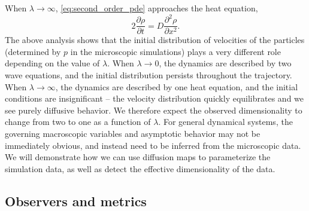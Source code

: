 \documentclass[preprint]{elsarticle}
\begin{document}
When $\lambda \rightarrow \infty$, \eqref{eq:second_order_pde} approaches the heat equation,
\begin{equation}
2 \frac{\partial \rho}{\partial t} = D \frac{\partial ^2 \rho}{\partial x^2}.
\end{equation}
%
%
The above analysis shows that the initial distribution of velocities of the particles (determined by $p$ in the microscopic simulations) plays a very different role depending on the value of $\lambda$.
%
When $\lambda \rightarrow 0$, the dynamics are described by two wave equations, and the initial distribution persists throughout the trajectory.
%
When $\lambda \rightarrow \infty$, the dynamics are described by one heat equation, and the initial conditions are insignificant -- the velocity distribution quickly equilibrates and we see purely diffusive behavior.
%
We therefore expect the observed dimensionality to change from two to one as a function of $\lambda$. 
%
For general dynamical systems, the governing macroscopic variables and asymptotic behavior may not be immediately obvious, and instead need to be inferred from the microscopic data.
%
We will demonstrate how we can use diffusion maps to parameterize the simulation data, as well as detect the effective dimensionality of the data.
%
%
%
%




\subsection{Observers and metrics}
\end{document}
